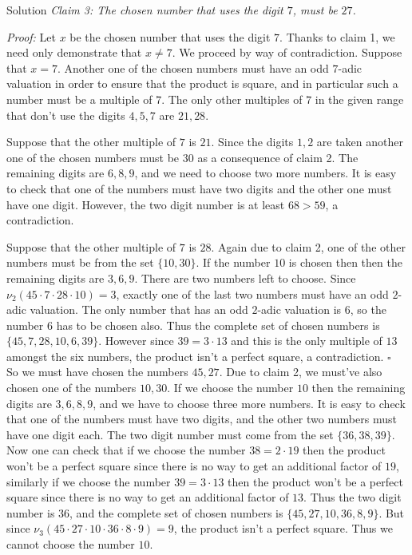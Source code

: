 \documentclass{article}
\begin{document}
\begin{solution}{Solution}
\textit{Claim 3: The chosen number that uses the digit $7$, must be $27$.}
\vspace{0.2cm}

\textit{Proof:} Let $x$ be the chosen number that uses the digit $7$.
Thanks to claim 1, we need only demonstrate that $x \neq 7$. We proceed by way
of contradiction. Suppose that $x = 7$. Another one of the chosen numbers must
have an odd $7$-adic valuation in order to ensure that the product is square, and
in particular such a number must be a multiple of $7$. The only other multiples of
$7$ in the given range that don't use the digits $4,5,7$ are $21, 28$.
\vspace{0.2cm}

Suppose that the other multiple of $7$ is $21$. Since the digits $1,2$ are taken
another one of the chosen numbers must be $30$ as a consequence of claim 2.
The remaining digits are $6,8,9$, and we need to choose two more numbers. It is
easy to check that one of the numbers must have two digits and the other one must
have one digit. However, the two digit number is at least $68 > 59$, a
contradiction. \vspace{0.2cm}

Suppose that the other multiple of $7$ is $28$. Again due to claim 2, one of the
other numbers must be from the set $\{ 10, 30 \}$. If the number $10$ is chosen
then then the remaining digits are $3,6,9$. There are two numbers left to choose.
Since
$\nu_2 (45\cdot 7\cdot 28\cdot 10) = 3$, exactly one of the last two numbers must
have an
odd $2$-adic valuation. The only number that has an odd $2$-adic valuation is $6$,
so the number $6$ has to be chosen also. Thus the complete set of chosen numbers
is $\{ 45, 7, 28, 10, 6, 39 \}$. However since $39 = 3\cdot 13$ and this is the
only multiple of $13$ amongst the six numbers, the product isn't a perfect square,
a contradiction. $\square$ \\

So we must have chosen the numbers $45, 27$. Due to claim 2, we must've also
chosen one of the numbers $10, 30$. If we choose the number $10$ then the
remaining digits are $3,6,8,9$, and we have to choose three more numbers. It is
easy to check that one of the numbers must have two digits, and the other two
numbers must have one digit each. The two digit number must come from the set
$\{ 36, 38, 39 \}$. Now one can check that if we choose the number
$38 = 2 \cdot 19$ then the product won't be a perfect square since there is no
way to get an additional factor of $19$, similarly if we choose the number
$39 = 3 \cdot 13$ then the product won't be a perfect square since there is no way
to get an additional factor of $13$. Thus the two digit number is $36$, and the
complete set of chosen numbers is $\{ 45, 27, 10, 36, 8, 9 \}$. But since
$\nu_3(45\cdot 27\cdot 10\cdot 36\cdot 8\cdot 9) = 9$, the product isn't a
perfect square. Thus we cannot choose the number $10$.
\vspace{0.2cm}


\end{solution}
\end{document}
